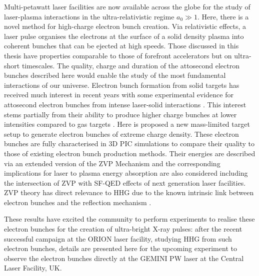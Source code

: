 Multi-petawatt laser facilities are now available across the globe for the study of laser-plasma interactions in the ultra-relativistic regime $a_0 \gg 1$. Here, there is a novel method for high-charge electron bunch creation. Via relativistic effects, a laser pulse organises the electrons at the surface of a solid density plasma into coherent bunches that can be ejected at high speeds. Those discussed in this thesis have properties comparable to those of forefront accelerators but on ultra-short timescales. The quality, charge and duration of the attosecond electron bunches described here would enable the study of the most fundamental interactions of our universe. Electron bunch formation from solid targets has received much interest in recent years \cite{kulaginCharacteristicsRelativisticElectron2009, huEnhancedDenseAttosecond2015, cantonoExtensiveStudyElectron2018, serebryakovNearsurfaceElectronAcceleration2017, zhangGiantIsolatedAttosecond2020, hornyGenerationSingleAttosecond2021, ongElectronTransportNanowire2021, kulaginSubrelativisticInfraredTerahertz2021} with some experimental evidence for attosecond electron bunches from intense laser-solid interactions \cite{linIsolatedAttosecondElectron2020, cardenasSubcycleDynamicsRelativistic2019, thevenetVacuumLaserAcceleration2016}. This interest stems partially from their ability to produce higher charge bunches at lower intensities compared to gas targets \cite{linIsolatedAttosecondElectron2020}. Here is proposed a new mass-limited target setup to generate electron bunches of extreme charge density. These electron bunches are fully characterised in 3D \ac{PIC} simulations to compare their quality to those of existing electron bunch production methods. Their energies are described via an extended version of the \ac{ZVP} Mechanism and the corresponding implications for laser to plasma energy absorption are also considered including the intersection of \ac{ZVP} with \ac{SF-QED} effects of next generation laser facilities. \ac{ZVP} theory has direct relevance to \ac{HHG} due to the known intrinsic link between electron bunches and the reflection mechanism \cite{cousensElectronTrajectoriesAssociated2020, savinAttosecondscaleAbsorptionExtreme2017}.

These results have excited the community to perform experiments to realise these electron bunches for the creation of ultra-bright X-ray pulses: after the recent successful campaign at the ORION laser facility, studying \ac{HHG} from such electron bunches, details are presented here for the upcoming experiment to observe the electron bunches directly at the GEMINI PW laser at the Central Laser Facility, UK.

